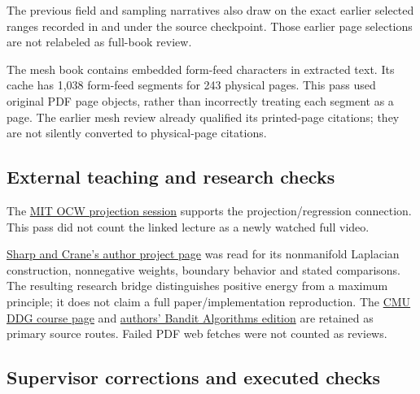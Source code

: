 The previous field and sampling narratives also draw on the exact earlier selected ranges recorded in  and  under the source checkpoint. Those earlier page selections are not relabeled as full-book review.

The mesh book contains embedded form-feed characters in extracted text. Its cache has 1,038 form-feed segments for 243 physical pages. This pass used original PDF page objects, rather than incorrectly treating each segment as a page. The earlier mesh review already qualified its printed-page citations; they are not silently converted to physical-page citations.

\subsection{External teaching and research checks}\label{appendix-5056f3debc1f-external-teaching-and-research-checks}

\hypertarget{appendix-5056f3debc1f-external-teaching-and-research-checks}{}

The \href{https://www.ocw.mit.edu/courses/18-06sc-linear-algebra-fall-2011/pages/least-squares-determinants-and-eigenvalues/projection-matrices-and-least-squares/}{MIT OCW projection session} supports the projection/regression connection. This pass did not count the linked lecture as a newly watched full video.

\href{https://www.cs.cmu.edu/~kmcrane/Projects/NonmanifoldLaplace/index.html}{Sharp and Crane's author project page} was read for its nonmanifold Laplacian construction, nonnegative weights, boundary behavior and stated comparisons. The resulting research bridge distinguishes positive energy from a maximum principle; it does not claim a full paper/implementation reproduction. The \href{https://www.cs.cmu.edu/~kmcrane/Projects/DGPDEC/index.html}{CMU DDG course page} and \href{https://tor-lattimore.com/downloads/book/book.pdf}{authors' Bandit Algorithms edition} are retained as primary source routes. Failed PDF web fetches were not counted as reviews.

\subsection{Supervisor corrections and executed checks}\label{appendix-5056f3debc1f-supervisor-corrections-and-executed-checks}

\hypertarget{appendix-5056f3debc1f-supervisor-corrections-and-executed-checks}{}

